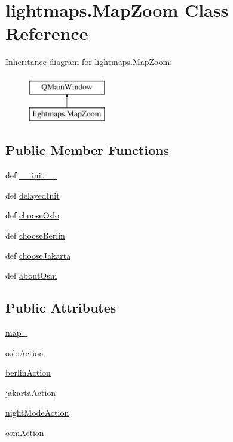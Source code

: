 \hypertarget{classlightmaps_1_1MapZoom}{}\section{lightmaps.\+Map\+Zoom Class Reference}
\label{classlightmaps_1_1MapZoom}
Inheritance diagram for lightmaps.\+Map\+Zoom\+:\begin{figure}[H]
\begin{center}
\leavevmode
\includegraphics[height=2.000000cm]{classlightmaps_1_1MapZoom}
\end{center}
\end{figure}
\subsection*{Public Member Functions}
\begin{DoxyCompactItemize}
\item 
def \hyperlink{classlightmaps_1_1MapZoom_a3f4e567ecbd3c150668df7a878f4ecd5}{\+\_\+\+\_\+init\+\_\+\+\_\+}
\item 
def \hyperlink{classlightmaps_1_1MapZoom_a19955b5afbbf7220d366e1dc71a36674}{delayed\+Init}
\item 
def \hyperlink{classlightmaps_1_1MapZoom_ab68f0746d24e75af6aba9206ed0b0bb5}{choose\+Oslo}
\item 
def \hyperlink{classlightmaps_1_1MapZoom_a24da17a778be0f0eded4f2a13a771a18}{choose\+Berlin}
\item 
def \hyperlink{classlightmaps_1_1MapZoom_ac4cf1ce75a82c3266ec2ebf440e1d339}{choose\+Jakarta}
\item 
def \hyperlink{classlightmaps_1_1MapZoom_a526d1a59890f6fe1b8731ab8d99fc890}{about\+Osm}
\end{DoxyCompactItemize}
\subsection*{Public Attributes}
\begin{DoxyCompactItemize}
\item 
\hyperlink{classlightmaps_1_1MapZoom_a4a449303bff5c2277a2d685880a735f7}{map\+\_\+}
\item 
\hyperlink{classlightmaps_1_1MapZoom_ae838c03d76d435964179e4a0e67d9fef}{oslo\+Action}
\item 
\hyperlink{classlightmaps_1_1MapZoom_acac642f422b3e8d3caf92881b9ca1c9f}{berlin\+Action}
\item 
\hyperlink{classlightmaps_1_1MapZoom_acfbf75b53414ecb6a37687e89e79962a}{jakarta\+Action}
\item 
\hyperlink{classlightmaps_1_1MapZoom_ae4c4a7598a0adf0dbf4f711cfd75df8d}{night\+Mode\+Action}
\item 
\hyperlink{classlightmaps_1_1MapZoom_a9d5eddaa6e5c03d6d3c425a27955b9cd}{osm\+Action}
\end{DoxyCompactItemize}


